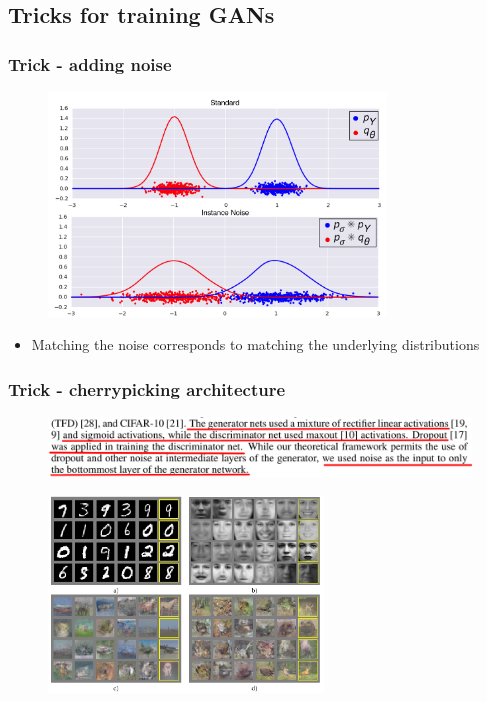 \documentclass{Bredelebeamer}
\begin{document}
\subsection{Tricks for training GANs}
\begin{frame}
	\frametitle{Trick - adding noise}
	\begin{figure}[h!]
		\centering
		\includegraphics[width=0.8\textwidth]{instance_noise.png}
	\end{figure}
	\begin{itemize}
		\item Matching the noise corresponds to matching the underlying distributions
	\end{itemize}
\end{frame}
\begin{frame}
	\frametitle{Trick - cherrypicking architecture}
		\begin{figure}[h!]
			\centering
			\includegraphics[width=\textwidth]{original_GAN_guidelines.png}
		\end{figure}
		\pause
		\begin{figure}[h!]
			\centering
			\includegraphics[width=0.65\textwidth]{original_GAN_results.png}
		\end{figure}
\end{frame}
\end{document}
